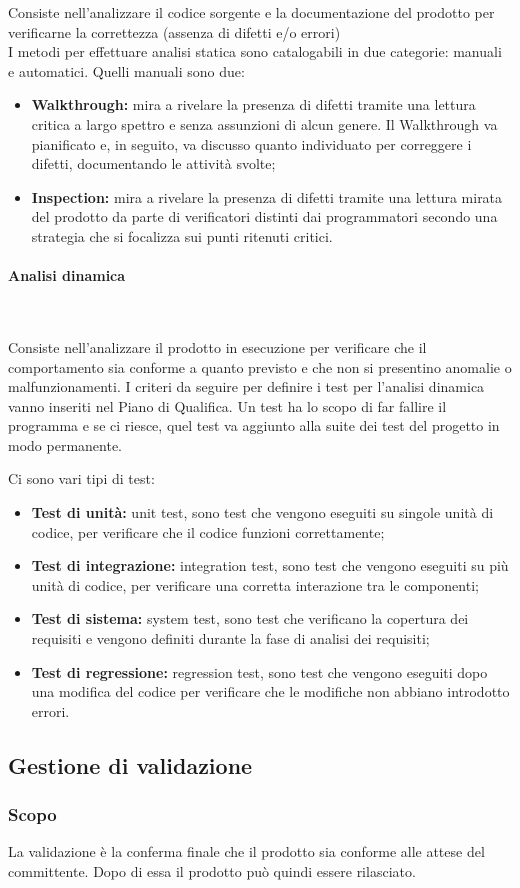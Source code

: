 Consiste nell'analizzare il codice sorgente e la documentazione del prodotto per verificarne la correttezza (assenza di difetti e/o errori)\\
I metodi per effettuare analisi statica sono catalogabili in due categorie: manuali e automatici.
Quelli manuali sono due:
\begin{itemize}
    \item \textbf{Walkthrough:} mira a rivelare la presenza di difetti tramite una lettura critica a largo spettro e senza assunzioni di alcun genere. Il Walkthrough va pianificato e, in seguito, va discusso quanto individuato per correggere i difetti, documentando le attività svolte;
    \item \textbf{Inspection:} mira a rivelare la presenza di difetti tramite una lettura mirata del prodotto da parte di verificatori distinti dai programmatori secondo una strategia che si focalizza sui punti ritenuti critici. 
\end{itemize}

\paragraph{Analisi dinamica} ~

Consiste nell'analizzare il prodotto in esecuzione per verificare che il comportamento sia conforme a quanto previsto e che non si presentino anomalie o malfunzionamenti.
I criteri da seguire per definire i test per l'analisi dinamica vanno inseriti nel Piano di Qualifica. Un test ha lo scopo di far fallire il programma e se ci riesce, quel test va aggiunto alla suite dei test del progetto in modo permanente.

Ci sono vari tipi di test:
\begin{itemize}
    \item \textbf{Test di unità:} unit test, sono test che vengono eseguiti su singole unità di codice, per verificare che il codice funzioni correttamente;
    \item \textbf{Test di integrazione:} integration test, sono test che vengono eseguiti su più unità di codice, per verificare una corretta interazione tra le componenti;
    \item \textbf{Test di sistema:} system test, sono test che verificano la copertura dei requisiti e vengono definiti durante la fase di analisi dei requisiti;
    \item \textbf{Test di regressione:} regression test, sono test che vengono eseguiti dopo una modifica del codice per verificare che le modifiche non abbiano introdotto errori.
\end{itemize}

\subsection{Gestione di validazione}
\subsubsection{Scopo} 
La validazione è la conferma finale che il prodotto sia conforme alle attese del committente. Dopo di essa il prodotto può quindi essere rilasciato.\\



